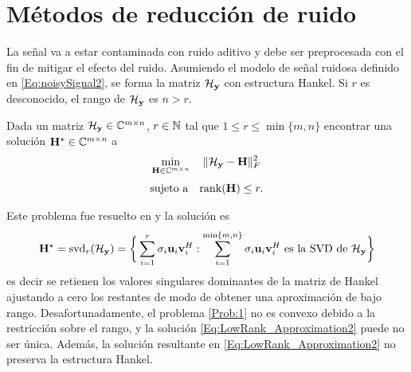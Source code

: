 %	

	
	\section{Métodos de reducción de ruido}

	La señal va a estar contaminada con ruido aditivo y debe ser preprocesada con el fin de mitigar el efecto del ruido. Asumiendo el modelo de señal ruidosa definido en \eqref{Eq:noisySignal2}, se forma la matriz $\mathcal{H}_{\mathbf{y}}$ con estructura Hankel. Si $r$ es desconocido, el rango de $\mathcal{H}_{\mathbf{y}}$ es $n>r$.


	\begin{Prob}\label{Prob:1}
		Dada un matriz $\mathcal{H}_{\mathbf{y}}\in\mathbb{C}^{m\times n}$, $r\in\mathbb{N}$ tal que $1\le r\le \min\{m,n\}$ encontrar una solución $\mathbf{H}^\star\in\mathbb{C}^{m\times n}$ a 
		\begin{equation}
			\begin{aligned} 
				& \min_{\mathbf{H}\in\mathbb{C}^{m\times n}} \quad \|\mathcal{H}_{\mathbf{y}}-\mathbf{H}\|_F^2\\[0.3em]
				& \text{sujeto a} \quad \mathrm{rank}(\mathbf{H}) \le r.
			\end{aligned}
			\label{Eq:LowRank_Approximation1}
		\end{equation}
	\end{Prob}
	Este problema fue resuelto en \cite{Eckart1936} y la solución es 
	\begin{equation}
		\mathbf{H}^\star = \mathrm{svd}_r(\mathcal{H}_{\mathbf{y}}) =\bigg\{ \sum_{i=1}^r\sigma_i\mathbf{u}_i\mathbf{v}_i^H : \sum_{i=1}^{\min\{m,n\}}\sigma_i\mathbf{u}_i\mathbf{v}_i^H  \text{ es la SVD de } \mathcal{H}_{\mathbf{y}}\bigg\}
		\label{Eq:LowRank_Approximation2}
	\end{equation}
	es decir se retienen los valores singulares dominantes de la matriz de Hankel ajustando a cero los restantes de modo de obtener una aproximación de bajo rango. Desafortunadamente, el problema \eqref{Prob:1} no es convexo debido a la restricción sobre el rango, y la solución \eqref{Eq:LowRank_Approximation2} puede no ser única. Además, la solución resultante en \eqref{Eq:LowRank_Approximation2} no preserva la estructura Hankel.  

